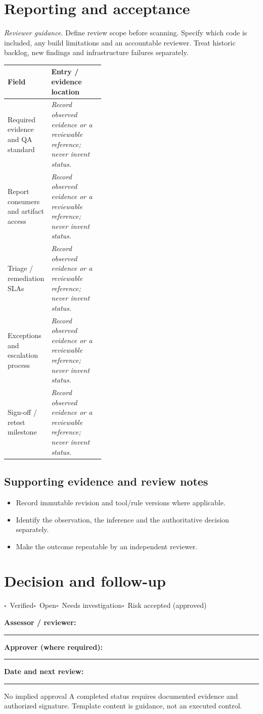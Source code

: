 \documentclass[10pt,letterpaper]{article}
\newcommand{\checkbox}{\(\square\)}
\newcommand{\blankline}{\noindent\rule{\linewidth}{0.35pt}\par\vspace{4pt}}
\begin{document}
\section{Reporting and acceptance}
\textit{Reviewer guidance.} Define review scope before scanning. Specify which code is included, any build limitations and an accountable reviewer. Treat historic backlog, new findings and infrastructure failures separately.
\begin{tabularx}{\linewidth}{@{}p{0.38\linewidth}Y@{}}
\toprule Field & Entry / evidence location\\\midrule
Required evidence and QA standard & \textit{Record observed evidence or a reviewable reference; never invent status.}\\[1.0em]
\midrule
Report consumers and artifact access & \textit{Record observed evidence or a reviewable reference; never invent status.}\\[1.0em]
\midrule
Triage / remediation SLAs & \textit{Record observed evidence or a reviewable reference; never invent status.}\\[1.0em]
\midrule
Exceptions and escalation process & \textit{Record observed evidence or a reviewable reference; never invent status.}\\[1.0em]
\midrule
Sign-off / retest milestone & \textit{Record observed evidence or a reviewable reference; never invent status.}\\[1.0em]
\midrule
\end{tabularx}
\subsection{Supporting evidence and review notes}
\begin{itemize}
\item Record immutable revision and tool/rule versions where applicable.
\item Identify the observation, the inference and the authoritative decision separately.
\item Make the outcome repeatable by an independent reviewer.
\end{itemize}
\clearpage
\section{Decision and follow-up}
\noindent\checkbox\ Verified\quad\checkbox\ Open\quad\checkbox\ Needs investigation\quad\checkbox\ Risk accepted (approved)\par
\noindent\textbf{Assessor / reviewer:}\par\blankline\textbf{Approver (where required):}\par\blankline\textbf{Date and next review:}\par\blankline
\begin{warnbox}{No implied approval}
A completed status requires documented evidence and authorized signature. Template content is guidance, not an executed control.\end{warnbox}
\end{document}
